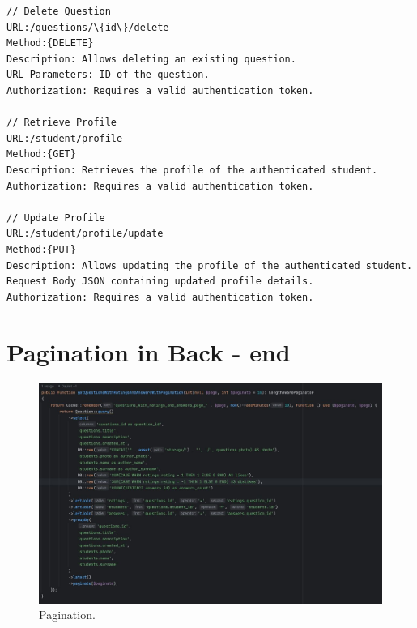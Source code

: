 \begin{lstlisting}[style=php, caption={PHP URLs code}]
// Delete Question
URL:/questions/\{id\}/delete
Method:{DELETE}
Description: Allows deleting an existing question.
URL Parameters: ID of the question.
Authorization: Requires a valid authentication token.

// Retrieve Profile
URL:/student/profile
Method:{GET}
Description: Retrieves the profile of the authenticated student.
Authorization: Requires a valid authentication token.

// Update Profile
URL:/student/profile/update
Method:{PUT}
Description: Allows updating the profile of the authenticated student.
Request Body JSON containing updated profile details.
Authorization: Requires a valid authentication token.
\end{lstlisting}

\section{Pagination in Back - end}
\begin{figure}[H]\label{fig:pagination}
  \centering
  \includegraphics[width=0.8\linewidth]{figures/Pagination.jpg}
  \caption{Pagination.}
\end{figure}
